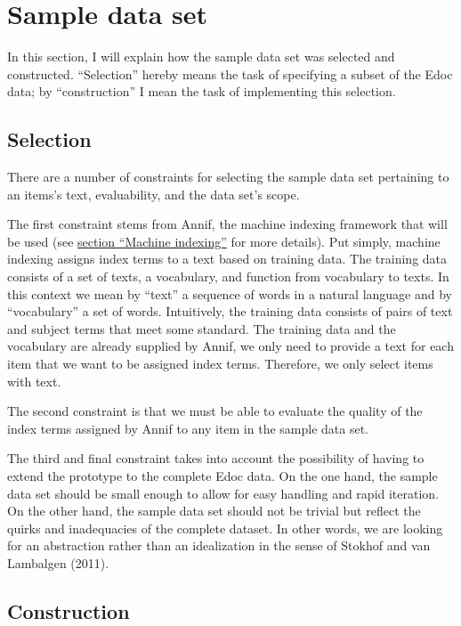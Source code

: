 \hypertarget{sample-data-set}{%
\section{Sample data set}\label{sample-data-set}}

In this section, I will explain how the sample data set was selected and
constructed. ``Selection'' hereby means the task of specifying a subset
of the Edoc data; by ``construction'' I mean the task of implementing
this selection.

\hypertarget{selection}{%
\subsection{Selection}\label{selection}}

There are a number of constraints for selecting the sample data set
pertaining to an items's text, evaluability, and the data set's scope.

The first constraint stems from Annif, the machine indexing framework
that will be used (see \protect\hyperlink{machine-indexing}{section
``Machine indexing''} for more details). Put simply, machine indexing
assigns index terms to a text based on training data. The training data
consists of a set of texts, a vocabulary, and function from vocabulary
to texts. In this context we mean by ``text'' a sequence of words in a
natural language and by ``vocabulary'' a set of words. Intuitively, the
training data consists of pairs of text and subject terms that meet some
standard. The training data and the vocabulary are already supplied by
Annif, we only need to provide a text for each item that we want to be
assigned index terms. Therefore, we only select items with text.

The second constraint is that we must be able to evaluate the quality of
the index terms assigned by Annif to any item in the sample data set.

The third and final constraint takes into account the possibility of
having to extend the prototype to the complete Edoc data. On the one
hand, the sample data set should be small enough to allow for easy
handling and rapid iteration. On the other hand, the sample data set
should not be trivial but reflect the quirks and inadequacies of the
complete dataset. In other words, we are looking for an abstraction
rather than an idealization in the sense of Stokhof and van Lambalgen
(2011).

\hypertarget{construction}{%
\subsection{Construction}\label{construction}}


